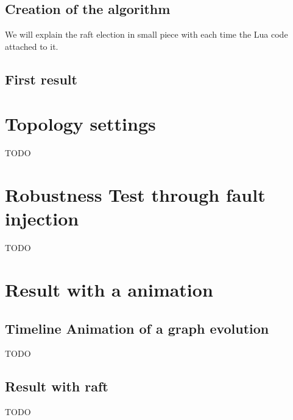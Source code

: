\documentclass{eplmastersthesis}
\begin{document}
        \subsection{Creation of the algorithm}
        We will explain the raft election in small piece with each time the Lua code attached to it.


        \subsection{First result}

      \section{Topology settings}

      {\color{red} TODO}

      \section{Robustness Test through fault injection}


      {\color{red} TODO}

      \section{Result with a animation}

        \subsection{Timeline Animation of a graph evolution}
          {\color{red} TODO}

        \subsection{Result with raft}
          {\color{red} TODO}
\end{document}
